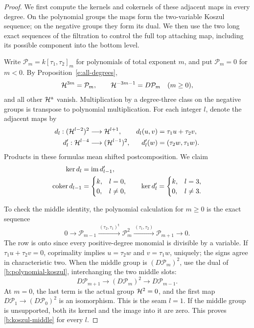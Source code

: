 \begin{proof}
We first compute the kernels and cokernels of these adjacent maps in
every degree. On the polynomial groups the maps form the two-variable
Koszul sequence; on the negative groups they form its dual. We then use the
two long exact sequences of the filtration to control the full top
attaching map, including its possible component into the bottom level.

Write
\(\mathcal P_m=k[\tau_1,\tau_2]_m\) for polynomials of total exponent
\(m\), and put \(\mathcal P_m=0\) for \(m<0\).
By Proposition~\ref{e:all-degrees},
\[
 \mathcal H^{3m}=\mathcal P_m,\qquad
 \mathcal H^{-3m-1}=D\mathcal P_m\quad(m\geq0),
\]
and all other \(\mathcal H^a\) vanish.  Multiplication by a degree-three
class on the negative groups is transpose to polynomial
multiplication.  For each integer \(l\), denote the adjacent maps by
\[
 \begin{aligned}
 d_l:(\mathcal H^{l-2})^2&\longrightarrow\mathcal H^{l+1},&
 d_l(u,v)&=\tau_1u+\tau_2v,\\
 d'_l:\mathcal H^{l-4}&\longrightarrow(\mathcal H^{l-1})^2,&
 d'_l(w)&=(\tau_2w,\tau_1w).
 \end{aligned}
\]
Products in these formulas mean shifted postcomposition.  We claim
\begin{align}
 \ker d_l&=\operatorname{im} d'_{l-1},\label{b:koszul-middle}\\
 \operatorname{coker} d_{l-1}&=
 \begin{cases}k,&l=0,\\0,&l\ne0,\end{cases}
 \qquad
 \ker d'_l=
 \begin{cases}k,&l=3,\\0,&l\ne3.\end{cases}
 \label{b:koszul-ends}
\end{align}

To check the middle identity, the polynomial calculation for \(m\geq0\)
is the exact sequence
\begin{equation}\label{b:polynomial-koszul}
 0\longrightarrow\mathcal P_{m-1}
 \xrightarrow{\,(\tau_2,\tau_1)^{\mathsf t}\,}
 \mathcal P_m^2
 \xrightarrow{\,(\tau_1,\tau_2)\,}
 \mathcal P_{m+1}\longrightarrow0 .
\end{equation}
The row is onto since every positive-degree monomial is divisible
by a variable.  If \(\tau_1u+\tau_2v=0\), coprimality implies
\(u=\tau_2w\) and \(v=\tau_1w\), uniquely; the signs agree in
characteristic two.  When the middle group is
\((D\mathcal P_m)^2\), use the dual of
\eqref{b:polynomial-koszul}, interchanging the two middle slots:
\[
 D\mathcal P_{m+1}\longrightarrow
 (D\mathcal P_m)^2\longrightarrow D\mathcal P_{m-1}.
\]
At \(m=0\), the last term is the actual group \(\mathcal H^2=0\), and the
first map \(D\mathcal P_1\to(D\mathcal P_0)^2\) is an isomorphism.
This is the seam \(l=1\).  If the middle group is unsupported, both
its kernel and the image into it are zero.  This proves
\eqref{b:koszul-middle} for every \(l\).


\end{proof}

